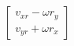 \documentclass[preview]{standalone}
\begin{document}
\begin{align*}
\begin{bmatrix} v_{xr}-\omega r_y\\ v_{yr}+\omega r_x\end{bmatrix}
\end{align*}
\end{document}

